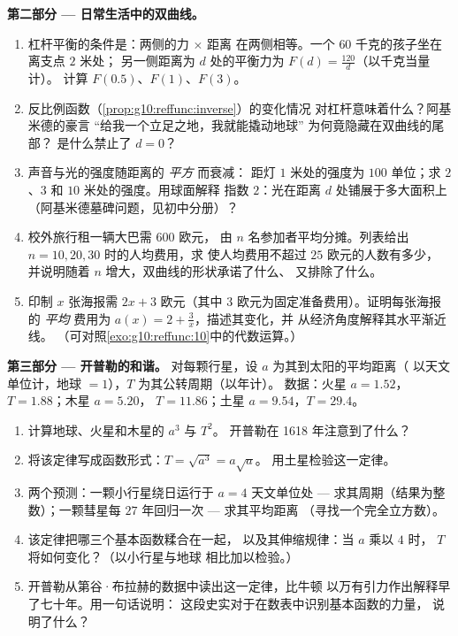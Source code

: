 \begin{problem}
\medskip
\noindent\textbf{第二部分 --- 日常生活中的双曲线。}
\begin{enumerate}[resume]
  \item 杠杆平衡的条件是：两侧的力 $\times$ 距离
        在两侧相等。一个 $60$ 千克的孩子坐在离支点 $2$ 米处；
        另一侧距离为 $d$ 处的平衡力为
        $F(d) = \frac{120}{d}$（以千克当量计）。
        计算 $F(0.5)$、$F(1)$、$F(3)$。
  \item 反比例函数（\cref{prop:g10:reffunc:inverse}）的变化情况
        对杠杆意味着什么？阿基米德的豪言
        “给我一个立足之地，我就能撬动地球”
        为何竟隐藏在双曲线的尾部？
        是什么禁止了 $d = 0$？
  \item 声音与光的强度随距离的 \emph{平方} 而衰减：
        距灯 $1$ 米处的强度为 $100$ 单位；求 $2$、$3$
        和 $10$ 米处的强度。用球面解释
        指数 $2$：光在距离 $d$ 处铺展于多大面积上
        （阿基米德墓碑问题，见初中分册）？
  \item 校外旅行租一辆大巴需 $600$ 欧元，
        由 $n$ 名参加者平均分摊。列表给出
        $n = 10, 20, 30$ 时的人均费用，求
        使人均费用不超过 $25$ 欧元的人数有多少，
        并说明随着 $n$ 增大，双曲线的形状承诺了什么、
        又排除了什么。
  \item 印制 $x$ 张海报需 $2x + 3$ 欧元（其中
        $3$ 欧元为固定准备费用）。证明每张海报的 \emph{平均} 费用为
        $a(x) = 2 + \frac3x$，描述其变化，并
        从经济角度解释其水平渐近线。
        （可对照\cref{exo:g10:reffunc:10}中的代数运算。）
\end{enumerate}

\medskip
\noindent\textbf{第三部分 --- 开普勒的和谐。}
对每颗行星，设 $a$ 为其到太阳的平均距离（
以天文单位计，地球 $= 1$），$T$ 为其公转周期（以年计）。
数据：火星 $a = 1.52$，$T = 1.88$；木星 $a = 5.20$，
$T = 11.86$；土星 $a = 9.54$，$T = 29.4$。
\begin{enumerate}[resume]
  \item 计算地球、火星和木星的 $a^3$ 与 $T^2$。
        开普勒在 1618 年注意到了什么？
  \item 将该定律写成函数形式：$T = \sqrt{a^3} = a\sqrt a$。
        用土星检验这一定律。
  \item 两个预测：一颗小行星绕日运行于 $a = 4$ 天文单位处 ---
        求其周期（结果为整数）；一颗彗星每
        $27$ 年回归一次 --- 求其平均距离
        （寻找一个完全立方数）。
  \item 该定律把哪三个基本函数糅合在一起，
        以及其伸缩规律：当 $a$ 乘以 $4$ 时，
        $T$ 将如何变化？（以小行星与地球
        相比加以检验。）
  \item 开普勒从第谷·布拉赫的数据中读出这一定律，比牛顿
        以万有引力作出解释早了七十年。用一句话说明：
        这段史实对于在数表中识别基本函数的力量，
        说明了什么？
\end{enumerate}


\end{problem}
